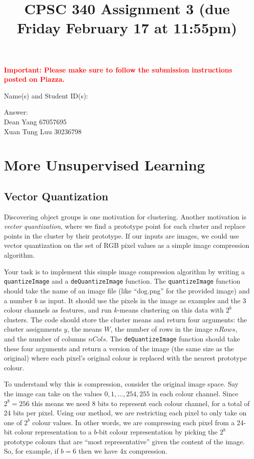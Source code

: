 \documentclass{article}
\newcommand{\blu}[1]{{\textcolor{blu}{#1}}}
\newcommand{\gre}[1]{\textcolor{gre}{#1}}
\newcommand{\red}[1]{\textcolor{red}{#1}}
\newcommand\ans[1]{\par\gre{Answer: #1}}
\let\ask\blu
\begin{document}
\title{CPSC 340 Assignment 3 (due Friday February 17 at 11:55pm)}
\date{}
\maketitle
\vspace{-6em}
\begin{center}\red{\bf Important: Please make sure to follow the submission instructions posted on Piazza.}\end{center}
\vspace{2em}

\ask{Name(s) and Student ID(s):}
\ans{\\
Dean Yang 67057695\\
Xuan Tung Luu 30236798
}

\section{More Unsupervised Learning}
\subsection{Vector Quantization}


Discovering object groups is one motivation for clustering. Another motivation is \emph{vector quantization}, where we find a prototype point for each cluster and replace points in the cluster by their prototype. If our inputs are images, we could use vector quantization on the set of RGB pixel values as a simple image compression algorithm.

Your task is to implement this simple image compression algorithm by writing a \texttt{quantizeImage} and a \texttt{deQuantizeImage} function. The \texttt{quantizeImage} function should take the name of an image file (like ``dog.png'' for the provided image) and a number $b$ as input. It should use the pixels in the image as examples and the 3 colour channels as features, and run $k$-means clustering on this data with $2^b$ clusters. The code should store the cluster means and return four arguments: the cluster assignments $y$, the means $W$, the number of rows in the image $nRows$, and the number of columns $nCols$. The \texttt{deQuantizeImage} function should take these four arguments and return a version of the image (the same size as the original) where each pixel's original colour is replaced with the nearest prototype colour.

To understand why this is compression, consider the original image space. Say the image can take on the values $0,1,\ldots,254,255$ in each colour channel. Since $2^8=256$ this means we need 8 bits to represent each colour channel, for a total of 24 bits per pixel. Using our method, we are restricting each pixel to only take on one of $2^b$ colour values. In other words, we are compressing each pixel from a 24-bit colour representation to a $b$-bit colour representation by picking the $2^b$ prototype colours that are ``most representative'' given the content of the image. So, for example, if $b=6$ then we have 4x compression.
\end{document}
